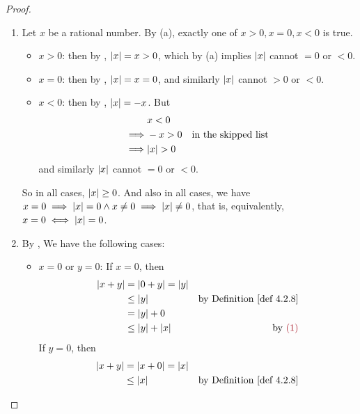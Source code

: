 \begin{proof}
\begin{enumerate}
    \item
        Let \(x\) be a rational number.
        By (a), exactly one of \(x > 0, x = 0, x < 0\) is true.
        \begin{itemize}
            \item \(x > 0\): then by , \(\lvert x\rvert = x > 0\), which by (a) implies \(\lvert x\rvert\) cannot \(= 0\) or \(< 0\).
            \item \(x = 0\): then by , \(\lvert x\rvert = x = 0\), and similarly \(\lvert x\rvert\) cannot \(> 0\) or \(< 0\).
            \item \(x < 0\): then by , \(\lvert x\rvert = -x\). But
                \begin{align*}
                             & x < 0 \\
                    \implies & -x > 0 & \text{in the skipped list} \\
                    \implies & \lvert x\rvert > 0
                \end{align*}
                and similarly \(\lvert x\rvert\) cannot \(= 0\) or \(< 0\).
        \end{itemize}
        So in all cases, \(\lvert x\rvert \ge 0\).
        And also in all cases, we have \(x = 0 \implies \lvert x\rvert = 0 \land x \neq 0 \implies \lvert x\rvert \neq 0\), that is, equivalently, \(x = 0 \iff \lvert x\rvert = 0\).
    \item
        By , We have the following cases:
        \begin{itemize}
            \item \(x = 0\) or \(y = 0\):
                If \(x = 0\), then
                \begin{align*}
                    \abs{x + y} & = \abs{0 + y} = \abs{y} \\
                                & \le \abs{y} & \text{by \DEF{4.2.8}} \\
                                & = \abs{y} + 0 \\
                                & \le \abs{y} + \abs{x} & \text{by \MAROON{(1)}}
                \end{align*}
                If \(y = 0\), then
                \begin{align*}
                    \abs{x + y} & = \abs{x + 0} = \abs{x} \\
                                & \le \abs{x} & \text{by \DEF{4.2.8}} \\

\end{align*}
\end{itemize}
\end{enumerate}
\end{proof}
